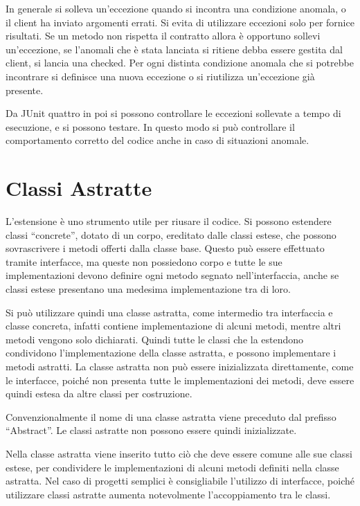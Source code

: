 \documentclass{article}
\numberwithin{equation}{subsection}
\begin{document}
In generale si solleva un'eccezione quando si incontra una condizione anomala, o il client ha inviato argomenti errati. Si evita di utilizzare eccezioni 
solo per fornice risultati. Se un metodo non rispetta il contratto allora è opportuno sollevi un'eccezione, se l'anomali che è stata lanciata si ritiene debba essere gestita dal client, si lancia una checked. 
Per ogni distinta condizione anomala che si potrebbe incontrare si definisce una nuova eccezione o si riutilizza un'eccezione già presente. 

Da JUnit quattro in poi si possono controllare le eccezioni sollevate a tempo di esecuzione, e si possono testare. In questo modo si può controllare il 
comportamento corretto del codice anche in caso di situazioni anomale.

\clearpage

\section{Classi Astratte}

L'estensione è uno strumento utile per riusare il codice. Si possono estendere classi ``concrete'', dotato di un corpo, ereditato dalle 
classi estese, che possono sovrascrivere i metodi offerti dalla classe base. 
Questo può essere effettuato tramite interfacce, ma queste non possiedono corpo e tutte le sue implementazioni devono definire ogni metodo segnato nell'interfaccia, anche 
se classi estese presentano una medesima implementazione tra di loro. 

Si può utilizzare quindi una classe astratta, come intermedio tra interfaccia e classe concreta, infatti contiene implementazione di alcuni metodi, mentre altri metodi 
vengono solo dichiarati. Quindi tutte le classi che la estendono condividono l'implementazione della classe astratta, e possono implementare i metodi astratti. 
La classe astratta non può essere inizializzata direttamente, come le interfacce, poiché non presenta tutte le implementazioni dei metodi, deve essere quindi estesa da altre 
classi per costruzione. 


Convenzionalmente il nome di una classe astratta viene preceduto dal prefisso ``Abstract''. Le classi astratte non possono essere quindi inizializzate. 

Nella classe astratta viene inserito tutto ciò che deve essere comune alle sue classi estese, per condividere le implementazioni di alcuni metodi definiti nella classe 
astratta. Nel caso di progetti semplici è consigliabile l'utilizzo di interfacce, poiché utilizzare classi astratte aumenta notevolmente l'accoppiamento tra le classi. 
\end{document}
